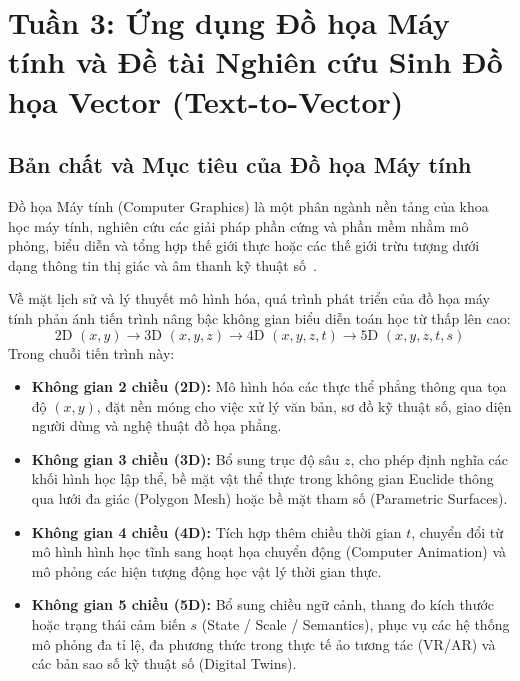 \section{Tuần 3: Ứng dụng Đồ họa Máy tính và Đề tài Nghiên cứu Sinh Đồ họa Vector (Text-to-Vector)}
\label{sec:week3}

\subsection{Bản chất và Mục tiêu của Đồ họa Máy tính}

Đồ họa Máy tính (Computer Graphics) là một phân ngành nền tảng của khoa học máy tính, nghiên cứu các giải pháp phần cứng và phần mềm nhằm mô phỏng, biểu diễn và tổng hợp thế giới thực hoặc các thế giới trừu tượng dưới dạng thông tin thị giác và âm thanh kỹ thuật số~\citep{hearn2004computer,foley1996computer}.

Về mặt lịch sử và lý thuyết mô hình hóa, quá trình phát triển của đồ họa máy tính phản ánh tiến trình nâng bậc không gian biểu diễn toán học từ thấp lên cao:
\begin{equation}
\text{2D } (x, y) \longrightarrow \text{3D } (x, y, z) \longrightarrow \text{4D } (x, y, z, t) \longrightarrow \text{5D } (x, y, z, t, s)
\end{equation}
Trong chuỗi tiến trình này:
\begin{itemize}
    \item \textbf{Không gian 2 chiều (2D):} Mô hình hóa các thực thể phẳng thông qua tọa độ $(x, y)$, đặt nền móng cho việc xử lý văn bản, sơ đồ kỹ thuật số, giao diện người dùng và nghệ thuật đồ họa phẳng.
    \item \textbf{Không gian 3 chiều (3D):} Bổ sung trục độ sâu $z$, cho phép định nghĩa các khối hình học lập thể, bề mặt vật thể thực trong không gian Euclide thông qua lưới đa giác (Polygon Mesh) hoặc bề mặt tham số (Parametric Surfaces).
    \item \textbf{Không gian 4 chiều (4D):} Tích hợp thêm chiều thời gian $t$, chuyển đổi từ mô hình hình học tĩnh sang hoạt họa chuyển động (Computer Animation) và mô phỏng các hiện tượng động học vật lý thời gian thực.
    \item \textbf{Không gian 5 chiều (5D):} Bổ sung chiều ngữ cảnh, thang đo kích thước hoặc trạng thái cảm biến $s$ (State / Scale / Semantics), phục vụ các hệ thống mô phỏng đa tỉ lệ, đa phương thức trong thực tế ảo tương tác (VR/AR) và các bản sao số kỹ thuật số (Digital Twins).
\end{itemize}

